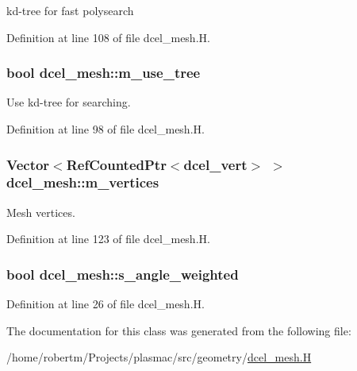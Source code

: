 kd-\/tree for fast polysearch 



Definition at line 108 of file dcel\+\_\+mesh.\+H.

\subsubsection[{\texorpdfstring{m\+\_\+use\+\_\+tree}{m_use_tree}}]{\setlength{\rightskip}{0pt plus 5cm}bool dcel\+\_\+mesh\+::m\+\_\+use\+\_\+tree\hspace{0.3cm}{\ttfamily [protected]}}\hypertarget{classdcel__mesh_a9ae4813711dd28edb74481426c53ff7f}{}\label{classdcel__mesh_a9ae4813711dd28edb74481426c53ff7f}


Use kd-\/tree for searching. 



Definition at line 98 of file dcel\+\_\+mesh.\+H.

\subsubsection[{\texorpdfstring{m\+\_\+vertices}{m_vertices}}]{\setlength{\rightskip}{0pt plus 5cm}Vector$<$Ref\+Counted\+Ptr$<${\bf dcel\+\_\+vert}$>$ $>$ dcel\+\_\+mesh\+::m\+\_\+vertices\hspace{0.3cm}{\ttfamily [protected]}}\hypertarget{classdcel__mesh_a42ad893d992ebf3efa5b5ca6e8dce4fb}{}\label{classdcel__mesh_a42ad893d992ebf3efa5b5ca6e8dce4fb}


Mesh vertices. 



Definition at line 123 of file dcel\+\_\+mesh.\+H.

\subsubsection[{\texorpdfstring{s\+\_\+angle\+\_\+weighted}{s_angle_weighted}}]{\setlength{\rightskip}{0pt plus 5cm}bool dcel\+\_\+mesh\+::s\+\_\+angle\+\_\+weighted\hspace{0.3cm}{\ttfamily [static]}}\hypertarget{classdcel__mesh_ade307a53055e25e8f22f12396335dd76}{}\label{classdcel__mesh_ade307a53055e25e8f22f12396335dd76}


Definition at line 26 of file dcel\+\_\+mesh.\+H.



The documentation for this class was generated from the following file\+:\begin{DoxyCompactItemize}
\item 
/home/robertm/\+Projects/plasmac/src/geometry/\hyperlink{dcel__mesh_8H}{dcel\+\_\+mesh.\+H}\end{DoxyCompactItemize}
